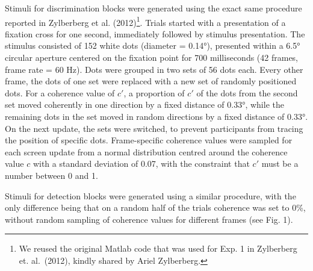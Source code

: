 \documentclass[12pt,twoside]{reedthesis}
\begin{document}
Stimuli for discrimination blocks were generated using the exact same procedure reported in Zylberberg et al. (2012)\footnote{We reused the original Matlab code that was used for Exp. 1 in Zylberberg et. al.~(2012), kindly shared by Ariel Zylberberg. }. Trials started with a presentation of a fixation cross for one second, immediately followed by stimulus presentation. The stimulus consisted of 152 white dots (diameter = 0.14°), presented within a 6.5° circular aperture centered on the fixation point for 700 milliseconds (42 frames, frame rate = 60 Hz). Dots were grouped in two sets of 56 dots each. Every other frame, the dots of one set were replaced with a new set of randomly positioned dots. For a coherence value of \(c'\), a proportion of \(c'\) of the dots from the second set moved coherently in one direction by a fixed distance of 0.33°, while the remaining dots in the set moved in random directions by a fixed distance of 0.33°. On the next update, the sets were switched, to prevent participants from tracing the position of specific dots. Frame-specific coherence values were sampled for each screen update from a normal distribution centred around the coherence value \(c\) with a standard deviation of 0.07, with the constraint that \(c'\) must be a number between 0 and 1.

Stimuli for detection blocks were generated using a similar procedure, with the only difference being that on a random half of the trials coherence was set to 0\%, without random sampling of coherence values for different frames (see Fig. 1).
\end{document}
